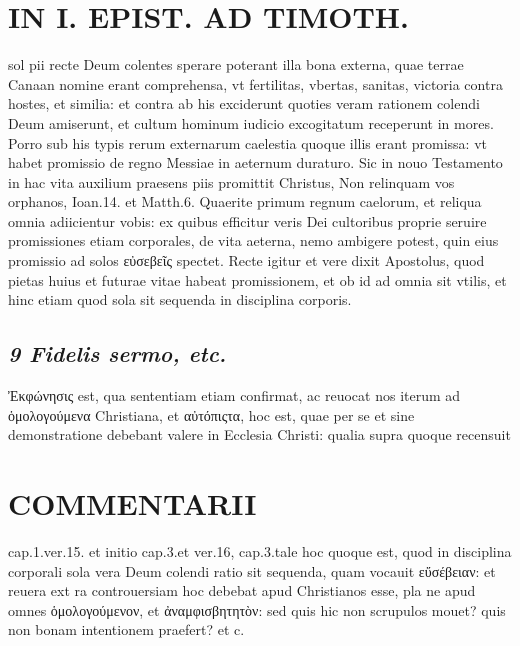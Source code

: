 \documentclass{article}
\begin{document}
\begin{pages}
\section*{IN I. EPIST. AD TIMOTH. }
\marginpar{[ p.101 ]}\pstart sol pii recte Deum colentes sperare poterant illa bona externa, quae terrae Canaan nomine erant comprehensa, vt fertilitas, vbertas, sanitas, victoria contra hostes, et similia: et contra ab his exciderunt quoties veram rationem colendi Deum amiserunt, et cultum hominum iudicio excogitatum receperunt in mores. Porro sub his typis rerum externarum caelestia quoque illis erant promissa: vt habet promissio de regno Messiae in aeternum duraturo. Sic in nouo Testamento in hac vita auxilium praesens piis promittit Christus, Non relinquam vos orphanos, Ioan.14. et Matth.6. Quaerite primum regnum caelorum, et reliqua omnia adiicientur vobis: ex quibus efficitur veris Dei cultoribus proprie seruire promissiones etiam corporales, de vita aeterna, nemo ambigere potest, quin eius promissio ad solos εὐσεβεῖς spectet. Recte igitur et vere dixit Apostolus, quod pietas huius et futurae vitae habeat promissionem, et ob id ad omnia sit vtilis, et hinc etiam quod sola sit sequenda in disciplina corporis.  \pend
{}
{}
\subsection*{\textit{9 Fidelis sermo, etc. }}\pstart Ἐκφώνησις est, qua sententiam etiam confirmat, ac reuocat nos iterum ad ὁμολογούμενα Christiana, et αὐτόπιςτα, hoc est, quae per se et sine demonstratione debebant valere in Ecclesia Christi: qualia supra quoque recensuit  \pend
\section*{COMMENTARII }
\marginpar{[ p.102 ]}\pstart cap.1.ver.15. et initio cap.3.et ver.16, cap.3.tale hoc quoque est, quod in disciplina corporali sola vera Deum colendi ratio sit sequenda, quam vocauit εὔσέβειαν: et reuera ext ra controuersiam hoc debebat apud Christianos esse, pla ne apud omnes ὁμολογούμενον, et ἀναμφισβητητὸν: sed quis hic non scrupulos mouet? quis non bonam intentionem praefert? et c.  \pend
{}
{}

\end{pages}
\end{document}
